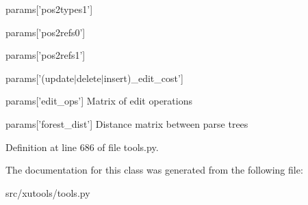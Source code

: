 params\mbox{[}'pos2types1'\mbox{]}

params\mbox{[}'pos2refs0'\mbox{]}

params\mbox{[}'pos2refs1'\mbox{]}

params\mbox{[}'(update$|$delete$|$insert)\-\_\-edit\-\_\-cost'\mbox{]}

params\mbox{[}'edit\-\_\-ops'\mbox{]} Matrix of edit operations

params\mbox{[}'forest\-\_\-dist'\mbox{]} Distance matrix between parse trees 

Definition at line 686 of file tools.\-py.



The documentation for this class was generated from the following file\-:\begin{DoxyCompactItemize}
\item 
src/xutools/tools.\-py\end{DoxyCompactItemize}
